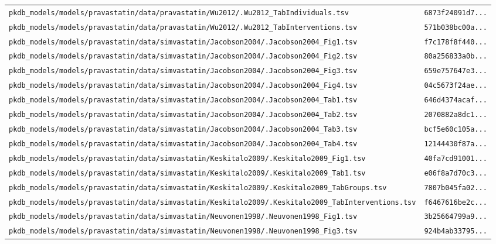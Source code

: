 \begin{longtable}{ll}
\texttt{pkdb\_models/models/pravastatin/data/pravastatin/Wu2012/.Wu2012\_TabIndividuals.tsv} & \texttt{6873f24091d7...} \\
\texttt{pkdb\_models/models/pravastatin/data/pravastatin/Wu2012/.Wu2012\_TabInterventions.tsv} & \texttt{571b038bc00a...} \\
\texttt{pkdb\_models/models/pravastatin/data/simvastatin/Jacobson2004/.Jacobson2004\_Fig1.tsv} & \texttt{f7c178f8f440...} \\
\texttt{pkdb\_models/models/pravastatin/data/simvastatin/Jacobson2004/.Jacobson2004\_Fig2.tsv} & \texttt{80a256833a0b...} \\
\texttt{pkdb\_models/models/pravastatin/data/simvastatin/Jacobson2004/.Jacobson2004\_Fig3.tsv} & \texttt{659e757647e3...} \\
\texttt{pkdb\_models/models/pravastatin/data/simvastatin/Jacobson2004/.Jacobson2004\_Fig4.tsv} & \texttt{04c5673f24ae...} \\
\texttt{pkdb\_models/models/pravastatin/data/simvastatin/Jacobson2004/.Jacobson2004\_Tab1.tsv} & \texttt{646d4374acaf...} \\
\texttt{pkdb\_models/models/pravastatin/data/simvastatin/Jacobson2004/.Jacobson2004\_Tab2.tsv} & \texttt{2070882a8dc1...} \\
\texttt{pkdb\_models/models/pravastatin/data/simvastatin/Jacobson2004/.Jacobson2004\_Tab3.tsv} & \texttt{bcf5e60c105a...} \\
\texttt{pkdb\_models/models/pravastatin/data/simvastatin/Jacobson2004/.Jacobson2004\_Tab4.tsv} & \texttt{12144430f87a...} \\
\texttt{pkdb\_models/models/pravastatin/data/simvastatin/Keskitalo2009/.Keskitalo2009\_Fig1.tsv} & \texttt{40fa7cd91001...} \\
\texttt{pkdb\_models/models/pravastatin/data/simvastatin/Keskitalo2009/.Keskitalo2009\_Tab1.tsv} & \texttt{e06f8a7d70c3...} \\
\texttt{pkdb\_models/models/pravastatin/data/simvastatin/Keskitalo2009/.Keskitalo2009\_TabGroups.tsv} & \texttt{7807b045fa02...} \\
\texttt{pkdb\_models/models/pravastatin/data/simvastatin/Keskitalo2009/.Keskitalo2009\_TabInterventions.tsv} & \texttt{f6467616be2c...} \\
\texttt{pkdb\_models/models/pravastatin/data/simvastatin/Neuvonen1998/.Neuvonen1998\_Fig1.tsv} & \texttt{3b25664799a9...} \\
\texttt{pkdb\_models/models/pravastatin/data/simvastatin/Neuvonen1998/.Neuvonen1998\_Fig3.tsv} & \texttt{924b4ab33795...} \\

\end{longtable}
